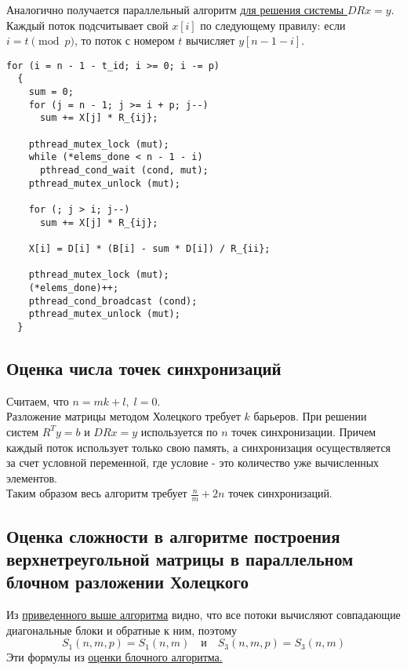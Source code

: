 \documentclass[a4paper,12pt]{article}
\begin{document}
    Аналогично получается параллельный алгоритм 
    \hyperlink{calc_x}{для решения системы $DRx = y$}.
    Каждый поток подсчитывает свой $x[i]$ по следующему правилу:
    если $i = t \pmod{p}$, то поток с номером $t$ вычисляет $y[n - 1 - i]$.

\begin{verbatim}
for (i = n - 1 - t_id; i >= 0; i -= p)
  {
    sum = 0;
    for (j = n - 1; j >= i + p; j--)
      sum += X[j] * R_{ij};
        
    pthread_mutex_lock (mut);
    while (*elems_done < n - 1 - i)
      pthread_cond_wait (cond, mut);
    pthread_mutex_unlock (mut);
      
    for (; j > i; j--)
      sum += X[j] * R_{ij};

    X[i] = D[i] * (B[i] - sum * D[i]) / R_{ii};
      
    pthread_mutex_lock (mut);
    (*elems_done)++;
    pthread_cond_broadcast (cond);
    pthread_mutex_unlock (mut);
  }
\end{verbatim}


\subsection{Оценка числа точек синхронизаций}
    Считаем, что $n = mk + l,\; l = 0$.\\
    
    Разложение матрицы методом Холецкого требует $k$ барьеров.
    При решении систем $R^T y = b$ и $DRx = y$ используется по $n$ точек синхронизации.
    Причем каждый поток использует только свою память, а синхронизация осуществляется 
    за счет условной переменной, где условие - это количество уже вычисленных элементов.\\
    
    Таким образом весь алгоритм требует 
    $\boxed {\frac{n}{m} + 2n}$ точек синхронизаций.
    

\newpage
\subsection{Оценка сложности в алгоритме построения верхнетреугольной матрицы
в параллельном блочном разложении Холецкого}
    Из \hyperlink{paral_alg}{приведенного выше алгоритма} видно, что все потоки 
    вычисляют совпадающие диагональные блоки и обратные к ним, поэтому 
    $$
        S_1(n,m,p) = S_1(n,m) \quad \text{и} \quad S_3(n,m,p) = S_3(n,m)
    $$
    Эти формулы из \hyperlink{block_border}{оценки блочного алгоритма.} \\
    
\end{document}
